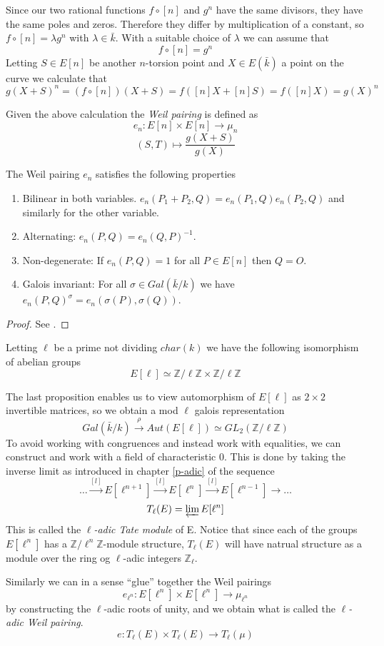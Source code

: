 Since our two rational functions $f \circ [n]$ and $g^n$ have the same divisors, they have the
same poles and zeros. Therefore they differ by multiplication of a constant, so
$f \circ [n] = \lambda g^n$ with $\lambda \in \bar{k}$. With a suitable choice of $\lambda$
we can assume that 
$$f \circ [n] = g^n$$
Letting $S \in E[n]$ be another $n$-torsion point and $X \in E(\bar{k})$ a point on the curve we calculate that
$$ g(X + S)^n = (f \circ [n])(X + S) = f([n]X + [n]S) = f([n]X) = g(X)^n $$
\begin{mydef}
 Given the above calculation the \emph{Weil pairing} is defined as
$$ e_n : E[n] \times E[n] \rightarrow \mu_n$$
$$ (S,T) \mapsto \frac{g(X + S)}{g(X)} $$
\end{mydef}

\begin{prop}
 The Weil pairing $e_n$ satisfies the following properties
\begin{enumerate}
 \item Bilinear in both variables. $e_n(P_1 + P_2, Q) = e_n(P_1,Q)e_n(P_2,Q)$ and similarly for the other variable.
 \item Alternating: $e_n(P,Q) = e_n(Q,P)^{-1}$.
 \item Non-degenerate: If $e_n(P,Q) = 1$ for all $P \in E[n]$ then $Q=O$.
 \item Galois invariant: For all $\sigma \in Gal(\bar{k}/k)$ we have $e_n(P,Q)^\sigma = e_n(\sigma(P),\sigma(Q))$.
\end{enumerate}
\end{prop}
\begin{proof}
 See \cite{AEC}.
\end{proof}

\begin{prop}
Letting $\ell$ be a prime not dividing $char(k)$ we have the following isomorphism of abelian groups
 $$ E[\ell] \simeq \mathbb{Z}/\ell\mathbb{Z} \times \mathbb{Z}/\ell\mathbb{Z} $$
\end{prop}

The last proposition enables us to view automorphism of $E[\ell]$ as $2\times 2$ invertible matrices,
so we obtain a  mod $\ell$ galois representation
$$ Gal(\bar{k}/k) \overset{\rho}{\rightarrow} Aut(E[\ell]) \simeq GL_2(\mathbb{Z}/\ell\mathbb{Z}) $$
To avoid working with congruences and instead work with equalities, we can construct
and work with a field of characteristic 0. This is done by taking the inverse limit 
as introduced in chapter \ref{p-adic} of the sequence
$$ \dots \overset{[l]}{\rightarrow} E[\ell^{n+1}] \overset{[l]}{\rightarrow} E[\ell^{n}] \overset{[l]}{\rightarrow} E[\ell^{n-1}] \rightarrow \ldots $$
$$ T_\ell(E) = \varprojlim E[\ell^n] $$
This is called the \emph{$\ell$-adic Tate module} of E. Notice that since each of the groups $E[\ell^n]$ has a
$\mathbb{Z}/\ell^n\mathbb{Z}$-module structure, $T_\ell(E)$ will have natrual structure as a module
over the ring og $\ell$-adic integers $\mathbb{Z}_\ell$.

Similarly we can in a sense ``glue'' together the Weil pairings
$$ e_{\ell^n} : E[\ell^n] \times E[\ell^n] \rightarrow \mu_{\ell^n} $$
by constructing the $\ell$-adic roots of unity, and we obtain what is called the
\emph{$\ell$-adic Weil pairing}.
$$ e: T_\ell(E) \times T_\ell(E) \rightarrow T_\ell(\mu) $$
